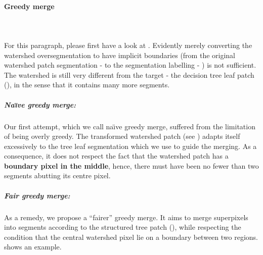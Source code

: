 \paragraph{Greedy merge}\mbox{}\\\mbox{}\\ %
For this paragraph, please first have a look at . Evidently merely converting the watershed oversegmentation to have implicit boundaries (from the original watershed patch segmentation -  to the segmentation labelling - ) is not sufficient. The watershed is still very different from the target - the decision tree leaf patch (), in the sense that it contains many more segments.

\subparagraph{Na\"{\i}ve greedy merge:} Our first attempt, which we call na\"{\i}ve greedy merge, suffered from the limitation of being overly 
greedy. The transformed watershed patch (see ) adapts itself excessively to the tree leaf segmentation which we use to guide the merging. As a consequence, it does not respect the fact that the watershed patch has a \textbf{boundary pixel in the middle}, hence, there must have been no fewer %
than two segments abutting its centre pixel.

\subparagraph{Fair greedy merge:}
\label{par:ch4-fair-greedy-merge}
As a remedy, we propose a ``fairer'' greedy merge. 
It aims to merge superpixels into segments according to the structured tree patch (), while respecting the condition that the central watershed pixel lie on a boundary between two regions. %
 shows an example.

